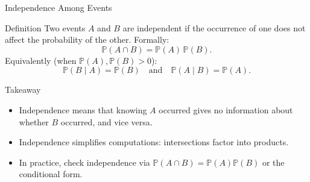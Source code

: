 \documentclass{beamer}
\renewcommand{\P}{\mathbb{P}}
\newcommand{\1}{\mathbf{1}}
\begin{document}
\begin{frame}{Independence Among Events}
  \small
  \begin{block}{Definition}
    Two events $A$ and $B$ are independent if the occurrence of one does not affect the probability of the other. Formally:
    \[
      \P(A \cap B) = \P(A)\,\P(B).
    \]
    Equivalently (when $\P(A),\P(B)>0$):
    \[
      \P(B\mid A) = \P(B) \quad\text{and}\quad \P(A\mid B) = \P(A).
    \]
  \end{block}

  \begin{exampleblock}{Takeaway}
    \begin{itemize}
      \item Independence means that knowing \( A \) occurred gives no information about whether \( B \) occurred, and vice versa.
      \item Independence simplifies computations: intersections factor into products.
      \item In practice, check independence via $\P(A\cap B)=\P(A)\P(B)$ or the conditional form.
    \end{itemize}
  \end{exampleblock}
\end{frame}
\end{document}
